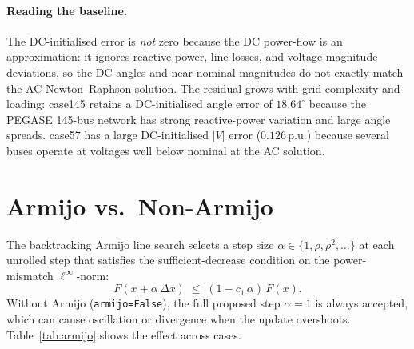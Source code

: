 \documentclass{article}
\begin{document}
\paragraph{Reading the baseline.}
The DC-initialised error is \emph{not} zero because the DC power-flow is an
approximation: it ignores reactive power, line losses, and voltage magnitude
deviations, so the DC angles and near-nominal magnitudes do not exactly match
the AC Newton--Raphson solution.  The residual grows with grid complexity and
loading: case145 retains a DC-initialised angle error of $18.64^\circ$ because
the PEGASE 145-bus network has strong reactive-power variation and large angle
spreads.  case57 has a large DC-initialised $|V|$ error ($0.126$\,p.u.)
because several buses operate at voltages well below nominal at the AC
solution.

\section{Armijo vs.\ Non-Armijo}

The backtracking Armijo line search selects a step size $\alpha \in
\{1, \rho, \rho^2, \ldots\}$ at each unrolled step that satisfies the
sufficient-decrease condition on the power-mismatch $\ell^\infty$-norm:
\[
  F(x + \alpha\,\Delta x) \;\le\; (1 - c_1\,\alpha)\,F(x).
\]
Without Armijo (\texttt{armijo=False}), the full proposed step $\alpha=1$
is always accepted, which can cause oscillation or divergence when the
update overshoots.  Table~\ref{tab:armijo} shows the effect across cases.
\end{document}
